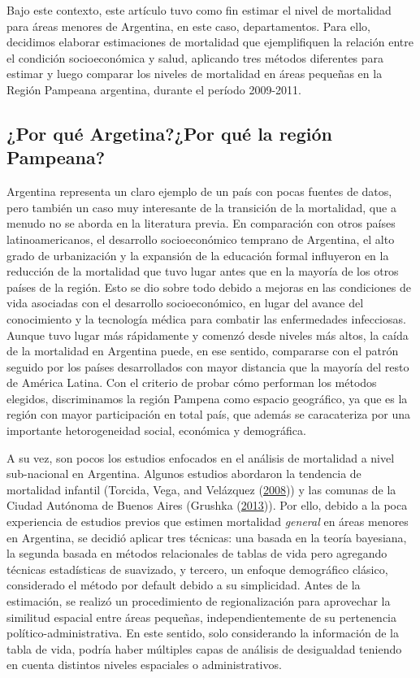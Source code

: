 \documentclass[12pt,]{article}
\begin{document}
Bajo este contexto, este artículo tuvo como fin estimar el nivel de
mortalidad para áreas menores de Argentina, en este caso, departamentos.
Para ello, decidimos elaborar estimaciones de mortalidad que
ejemplifiquen la relación entre el condición socioeconómica y salud,
aplicando tres métodos diferentes para estimar y luego comparar los
niveles de mortalidad en áreas pequeñas en la Región Pampeana argentina,
durante el período 2009-2011.

\hypertarget{por-quuxe9-argetinapor-quuxe9-la-regiuxf3n-pampeana}{%
\subsection{¿Por qué Argetina?¿Por qué la región
Pampeana?}\label{por-quuxe9-argetinapor-quuxe9-la-regiuxf3n-pampeana}}

Argentina representa un claro ejemplo de un país con pocas fuentes de
datos, pero también un caso muy interesante de la transición de la
mortalidad, que a menudo no se aborda en la literatura previa. En
comparación con otros países latinoamericanos, el desarrollo
socioeconómico temprano de Argentina, el alto grado de urbanización y la
expansión de la educación formal influyeron en la reducción de la
mortalidad que tuvo lugar antes que en la mayoría de los otros países de
la región. Esto se dio sobre todo debido a mejoras en las condiciones de
vida asociadas con el desarrollo socioeconómico, en lugar del avance del
conocimiento y la tecnología médica para combatir las enfermedades
infecciosas. Aunque tuvo lugar más rápidamente y comenzó desde niveles
más altos, la caída de la mortalidad en Argentina puede, en ese sentido,
compararse con el patrón seguido por los países desarrollados con mayor
distancia que la mayoría del resto de América Latina. Con el criterio de
probar cómo performan los métodos elegidos, discriminamos la región
Pampena como espacio geográfico, ya que es la región con mayor
participación en total país, que además se caracateriza por una
importante hetorogeneidad social, económica y demográfica.

A su vez, son pocos los estudios enfocados en el análisis de mortalidad
a nivel sub-nacional en Argentina. Algunos estudios abordaron la
tendencia de mortalidad infantil (Torcida, Vega, and Velázquez
(\protect\hyperlink{ref-torcida2008}{2008})) y las comunas de la Ciudad
Autónoma de Buenos Aires (Grushka
(\protect\hyperlink{ref-Grushka2013}{2013})). Por ello, debido a la poca
experiencia de estudios previos que estimen mortalidad \emph{general} en
áreas menores en Argentina, se decidió aplicar tres técnicas: una basada
en la teoría bayesiana, la segunda basada en métodos relacionales de
tablas de vida pero agregando técnicas estadísticas de suavizado, y
tercero, un enfoque demográfico clásico, considerado el método por
default debido a su simplicidad. Antes de la estimación, se realizó un
procedimiento de regionalización para aprovechar la similitud espacial
entre áreas pequeñas, independientemente de su pertenencia
político-administrativa. En este sentido, solo considerando la
información de la tabla de vida, podría haber múltiples capas de
análisis de desigualdad teniendo en cuenta distintos niveles espaciales
o administrativos.
\end{document}
